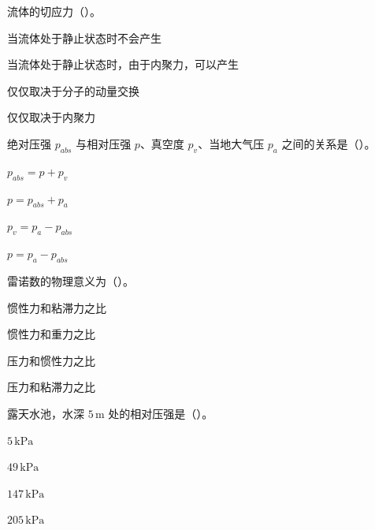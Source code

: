 \begin{ti}
  \item 流体的切应力（\quad）。\hfill{}
  \begin{choices}
    \item 当流体处于静止状态时不会产生
    \item 当流体处于静止状态时，由于内聚力，可以产生
    \item 仅仅取决于分子的动量交换
    \item 仅仅取决于内聚力
  \end{choices}

  \item 绝对压强 $p_{abs}$ 与相对压强 $p$、真空度 $p_v$、当地大气压 $p_a$ 之间的关系是（\quad）。\hfill{}
  \begin{choices}
    \item $p_{abs}=p+p_v$
    \item $p=p_{abs}+p_a$
    \item $p_v=p_a-p_{abs}$
    \item $p=p_a-p_{abs}$
  \end{choices}

  \item 雷诺数的物理意义为（\quad）。\hfill{}
  \begin{choices}
    \item 惯性力和粘滞力之比
    \item 惯性力和重力之比
    \item 压力和惯性力之比
    \item 压力和粘滞力之比
  \end{choices}

  \item 露天水池，水深 $5\,\mathrm{m}$ 处的相对压强是（\quad）。\hfill{}
  \begin{choices}
    \item $5\,\mathrm{kPa}$
    \item $49\,\mathrm{kPa}$
    \item $147\,\mathrm{kPa}$
    \item $205\,\mathrm{kPa}$
  \end{choices}


\end{ti}
